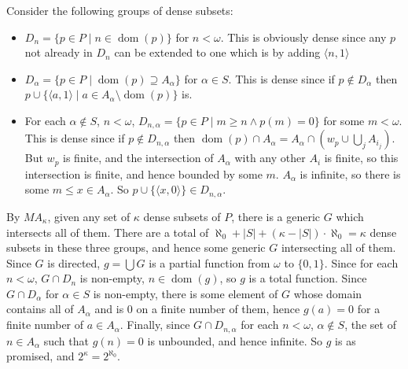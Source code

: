 \documentclass[12pt]{article}
\begin{document}
Consider the following groups of dense subsets:

\begin{itemize}
\item $D_n=\{p\in P\mid n\in\operatorname{dom}(p)\}$ for $n<\omega$.  This is obviously dense since any $p$ not already in $D_n$ can be extended to one which is by adding $\langle n,1\rangle$

\item $D_\alpha=\{p\in P\mid \operatorname{dom}(p)\supseteq A_\alpha\}$ for $\alpha\in S$.  This is dense since if $p\notin D_\alpha$ then $p\cup\{\langle a,1\rangle\mid a\in A_\alpha\setminus\operatorname{dom}(p)\}$ is.

\item For each $\alpha\notin S$, $n<\omega$, $D_{n,\alpha}=\{p\in P\mid m\geq n \wedge p(m)=0\}$ for some $m<\omega$.  This is dense since if $p\notin D_{n,\alpha}$ then $\operatorname{dom}(p)\cap A_\alpha=A_\alpha\cap\left(w_p\cup \bigcup_{j} A_{i_j}\right)$.  But $w_p$ is finite, and the intersection of $A_\alpha$ with any other $A_i$ is finite, so this intersection is finite, and hence bounded by some $m$.  $A_\alpha$ is infinite, so there is some $m\leq x\in A_\alpha$.  So $p\cup\{\langle x,0\rangle\}\in D_{n,\alpha}$.
\end{itemize}

By $MA_\kappa$, given any set of $\kappa$ dense subsets of $P$, there is a generic $G$ which intersects all of them.  There are a total of $\aleph_0+|S|+(\kappa-|S|)\cdot\aleph_0=\kappa$ dense subsets in these three groups, and hence some generic $G$ intersecting all of them.  Since $G$ is directed, $g=\bigcup G$ is a partial function from $\omega$ to $\{0,1\}$.  Since for each $n<\omega$, $G\cap D_n$ is non-empty, $n\in\operatorname{dom}(g)$, so $g$ is a total function.  Since $G\cap D_\alpha$ for $\alpha\in S$ is non-empty, there is some element of $G$ whose domain contains all of $A_\alpha$ and is $0$ on a finite number of them, hence $g(a)=0$ for a finite number of $a\in A_\alpha$.  Finally, since $G\cap D_{n,\alpha}$ for each $n<\omega$, $\alpha\notin S$, the set of $n\in A_\alpha$ such that $g(n)=0$ is unbounded, and hence infinite.  So $g$ is as promised, and $2^\kappa=2^{\aleph_0}$.
\end{document}

